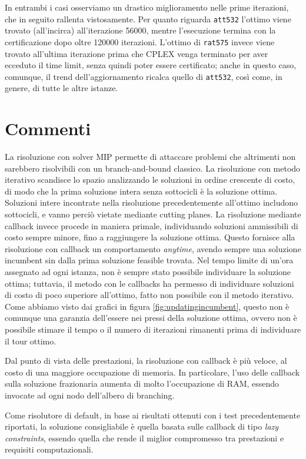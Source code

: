 In entrambi i casi osserviamo un drastico miglioramento nelle prime iterazioni, che in seguito rallenta vistosamente. Per quanto riguarda \texttt{att532} l'ottimo viene trovato (all'incirca) all'iterazione 56000, mentre l'esecuzione termina con la certificazione dopo oltre 120000 iterazioni. L'ottimo di \texttt{rat575} invece viene trovato all'ultima iterazione prima che CPLEX venga terminato per aver ecceduto il time limit, senza quindi poter essere certificato; anche in questo caso, comunque, il trend dell'aggiornamento ricalca quello di \texttt{att532}, così come, in genere, di tutte le altre istanze. 

\section{Commenti}
La risoluzione con solver MIP permette di attaccare problemi che altrimenti non sarebbero risolvibili con un branch-and-bound classico. La risoluzione con metodo iterativo scandisce lo spazio analizzando le soluzioni in ordine crescente di costo, di modo che la prima soluzione intera senza sottocicli è la soluzione ottima. Soluzioni intere incontrate nella risoluzione precedentemente all'ottimo includono sottocicli, e vanno perciò vietate mediante cutting planes. La risoluzione mediante callback invece procede in maniera primale, individuando soluzioni ammissibili di costo sempre minore, fino a raggiungere la soluzione ottima.  Questo fornisce alla risoluzione con callback un comportamento \textit{anytime}, avendo sempre una soluzione incumbent sin dalla prima soluzione feasible trovata. Nel tempo limite di un'ora assegnato ad ogni istanza, non è sempre stato possibile individuare la soluzione ottima; tuttavia, il metodo con le callbacks ha permesso di individuare soluzioni di costo di poco superiore all'ottimo, fatto non possibile con il metodo iterativo. Come abbiamo visto dai grafici in figura \ref{fig:updatingincumbent}, questo non è comunque una garanzia dell'essere nei pressi della soluzione ottima, ovvero non è possibile stimare il tempo o il numero di iterazioni rimanenti prima di individuare il tour ottimo.

Dal punto di vista delle prestazioni, la risoluzione con callback è più veloce, al costo di una maggiore occupazione di memoria. In particolare, l'uso delle callback sulla soluzione frazionaria aumenta di molto l'occupazione di RAM, essendo invocate ad ogni nodo dell'albero di branching.

Come risolutore di default, in base ai risultati ottenuti con i test precedentemente riportati, la soluzione consigliabile è quella basata sulle callback di tipo \textit{lazy constraints}, essendo quella che rende il miglior compromesso tra prestazioni e requisiti computazionali.

